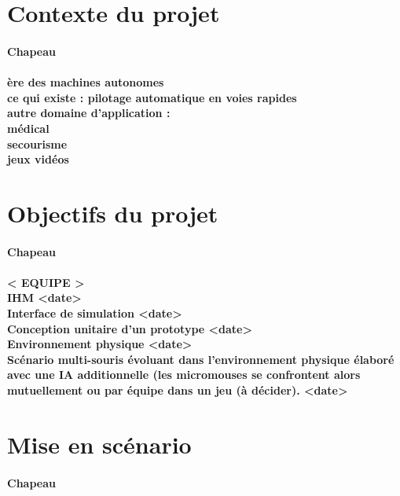 \section{Contexte du projet} \label{sec:introduction}

\paragraph{Chapeau}
\paragraph{
ère des machines autonomes
\\ce qui existe : pilotage automatique en voies rapides
\\autre domaine d'application :
\\médical
\\secourisme
\\jeux vidéos
\\
}

\section{Objectifs du projet} \label{sec:objectifs}

\paragraph{Chapeau}
\paragraph{
< EQUIPE >
\\ IHM <date>
\\ Interface de simulation <date>
\\ Conception unitaire d'un prototype <date>
\\ Environnement physique <date>
\\ Scénario multi-souris évoluant dans l'environnement physique élaboré avec une IA additionnelle (les micromouses se confrontent alors mutuellement ou par équipe dans un jeu (à décider). <date>
}

\section{Mise en scénario} \label{sec:miseEnScenario}

\paragraph{Chapeau}
